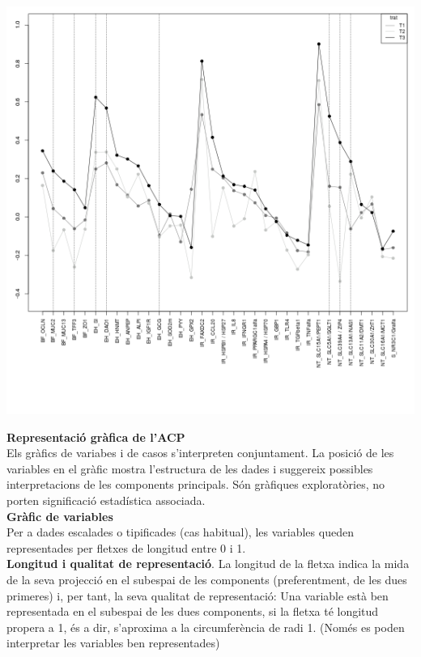 \documentclass[english]{article}
\begin{document}
\begin{center}
\includegraphics[scale=0.3]{app9.png}
\end{center}
\newpage

\noindent\textbf{Representació gràfica de l'ACP}\\

\noindent Els gràfics de variabes i de casos s'interpreten conjuntament. La posició de les variables en el gràfic mostra l'estructura de les dades i suggereix possibles interpretacions de les components principals. Són gràfiques exploratòries, no porten significació estadística associada.\\

\noindent\textbf{Gràfic de variables}\\

\noindent Per a dades escalades o tipificades (cas habitual), les variables queden representades per fletxes de longitud entre 0 i 1. \\

\textbf{Longitud i qualitat de representació}. La longitud de la fletxa indica la mida de la seva projecció en el subespai de les components (preferentment, de les dues primeres) i, per tant, la seva  qualitat de representació: Una variable està  ben representada  en el subespai de les dues components, si la fletxa té longitud propera a 1, és a dir, s'aproxima a la circumferència de radi 1. (Només es poden interpretar les variables ben representades)\\
\end{document}
